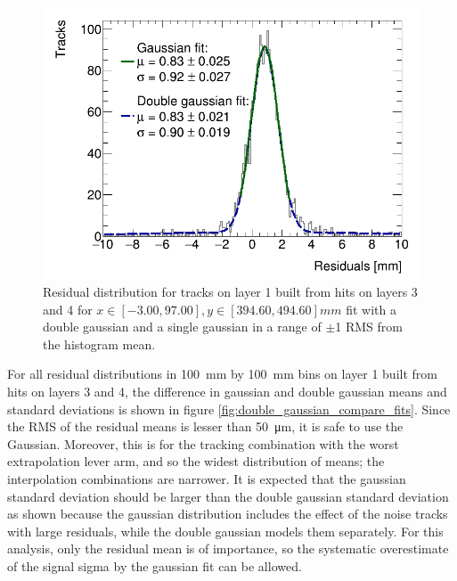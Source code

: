 \begin{figure}
    \centering
    \includegraphics[width = \textwidth]{figures/figure_double_gaussian_quick_and_dirty_2900V_log_scale_gaussian_QL2C04_2900V_2021-02-08_2_xbin_10_ybin_5_100mm.png}
    \caption{Residual distribution for tracks on layer 1 built from hits on layers 3 and 4 for $x\in\left[-3.00, 97.00\right],  y\in\left[394.60, 494.60\right] mm$ fit with a double gaussian and a single gaussian in a range of $\pm$1 RMS from the histogram mean.}
    \label{fig:double_gaussian_example_fit}
\end{figure}

For all residual distributions in \SI{100}{\milli\meter} by \SI{100}{\milli\meter} bins on layer 1 built from hits on layers 3 and 4, the difference in gaussian and double gaussian means and standard deviations is shown in figure \ref{fig:double_gaussian_compare_fits}. Since the RMS of the residual means is lesser than \SI{50}{\micro\meter}, it is safe to use the Gaussian. Moreover, this is for the tracking combination with the worst extrapolation lever arm, and so the widest distribution of means; the interpolation combinations are narrower. It is expected that the gaussian standard deviation should be larger than the double gaussian standard deviation as shown because the gaussian distribution includes the effect of the noise tracks with large residuals, while the double gaussian models them separately. For this analysis, only the residual mean is of importance, so the systematic overestimate of the signal sigma by the gaussian fit can be allowed.

